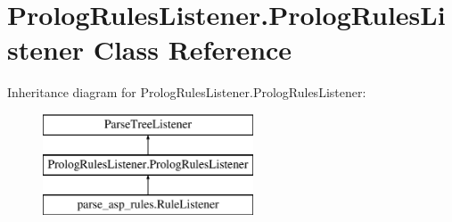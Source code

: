 \hypertarget{class_prolog_rules_listener_1_1_prolog_rules_listener}{}\section{Prolog\+Rules\+Listener.\+Prolog\+Rules\+Listener Class Reference}
\label{class_prolog_rules_listener_1_1_prolog_rules_listener}
Inheritance diagram for Prolog\+Rules\+Listener.\+Prolog\+Rules\+Listener\+:\begin{figure}[H]
\begin{center}
\leavevmode
\includegraphics[height=3.000000cm]{class_prolog_rules_listener_1_1_prolog_rules_listener}
\end{center}
\end{figure}

